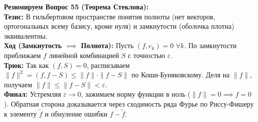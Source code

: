 \begin{tcolorbox}[colback=gray!5, colframe=black, boxrule=0.5pt, arc=0pt]
\textbf{Резюмируем Вопрос 55 (Теорема Стеклова):} \\
\textbf{Тезис:} В гильбертовом пространстве понятия полноты (нет векторов, ортогональных всему базису, кроме нуля) и замкнутости (оболочка плотна) эквивалентны. \\
\textbf{Ход (Замкнутость $\implies$ Полнота):} Пусть $(f, e_k) = 0 \,\, \forall k$. По замкнутости приближаем $f$ линейной комбинацией $S$ с точностью $\varepsilon$. \\
\textbf{Трюк:} Так как $(f, S) = 0$, расписываем $\|f\|^2 = (f, f-S) \le \|f\| \cdot \|f-S\|$ по Коши-Буняковскому. Деля на $\|f\|$, получаем $\|f\| \le \|f-S\| < \varepsilon$. \\
\textbf{Финал:} Устремляя $\varepsilon \to 0$, зажимаем норму функции в ноль ($\|f\| = 0 \implies f = 0$). Обратная сторона доказывается через сходимость ряда Фурье по Риссу-Фишеру к элементу $\tilde{f}$ и обнуление ошибки $f - \tilde{f}$.
\end{tcolorbox}